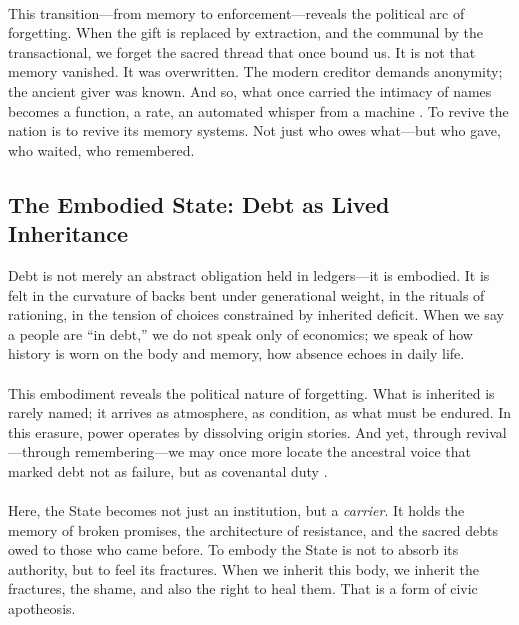 \documentclass[12pt]{article}
\begin{document}
\paragraph{} This transition—from memory to enforcement—reveals the political arc of forgetting. When the gift is replaced by extraction, and the communal by the transactional, we forget the sacred thread that once bound us. It is not that memory vanished. It was overwritten. The modern creditor demands anonymity; the ancient giver was known. And so, what once carried the intimacy of names becomes a function, a rate, an automated whisper from a machine \parencite{polanyi2001great}. To revive the nation is to revive its memory systems. Not just who owes what—but who gave, who waited, who remembered.

\subsection{The Embodied State: Debt as Lived Inheritance}

Debt is not merely an abstract obligation held in ledgers—it is embodied. It is felt in the curvature of backs bent under generational weight, in the rituals of rationing, in the tension of choices constrained by inherited deficit. When we say a people are “in debt,” we do not speak only of economics; we speak of how history is worn on the body and memory, how absence echoes in daily life.

\paragraph{} This embodiment reveals the political nature of forgetting. What is inherited is rarely named; it arrives as atmosphere, as condition, as what must be endured. In this erasure, power operates by dissolving origin stories. And yet, through revival—through remembering—we may once more locate the ancestral voice that marked debt not as failure, but as covenantal duty \parencite{graeber2011debt}.

\paragraph{} Here, the State becomes not just an institution, but a \emph{carrier}. It holds the memory of broken promises, the architecture of resistance, and the sacred debts owed to those who came before. To embody the State is not to absorb its authority, but to feel its fractures. When we inherit this body, we inherit the fractures, the shame, and also the right to heal them. That is a form of civic apotheosis.
\end{document}
